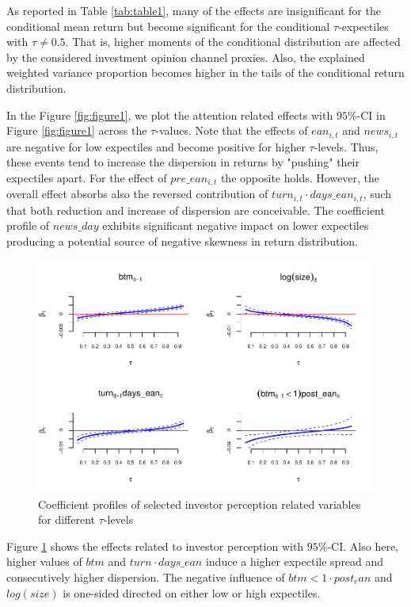 \documentclass[]{article}
\begin{document}
As reported in Table \ref{tab:table1}, many of the effects are insignificant for the conditional mean return but become significant for the conditional \(\tau\)-expectiles with \(\tau\not=0.5\). That is, higher moments of the conditional distribution are affected by the considered investment opinion channel proxies. Also, the explained weighted variance proportion becomes higher in the tails of the conditional return distribution.

In the Figure \ref{fig:figure1}, we plot the attention related effects with \(95\%\)-CI in Figure \ref{fig:figure1} across the \(\tau\)-values.
Note that the effects of $ean_{i,t}$ and $news_{i,t}$ are negative for low expectiles and become positive for higher $\tau$-levels. Thus, these events tend to increase the dispersion in returns by "pushing" their expectiles apart. For the effect of $pre\_ean_{i,t}$ the opposite holds. However, the overall effect absorbs also the reversed contribution of $turn_{i,t}\cdot days\_ean_{i,t}$, such that both reduction and increase of dispersion are conceivable. The coefficient profile of $news\_day$ exhibits significant negative impact on lower expectiles producing a potential source of negative skewness in return distribution.


\begin{figure}[h!]
\centering
\includegraphics{sentiment_analysis_files/figure-latex/figure2-1.pdf}
\caption{\label{fig:figure2}Coefficient profiles of selected investor perception related variables for different \(\tau\)-levels}
\end{figure}

Figure \ref{fig:figure2} shows the effects related to investor perception with $95\%$-CI. Also here, higher values of $btm$ and $turn \cdot days\_ean$ induce a higher expectile spread and consecutively higher dispersion. The negative influence of $btm<1\cdot post_ean$ and $log(size)$ is one-sided directed on either low or high expectiles.
\end{document}
